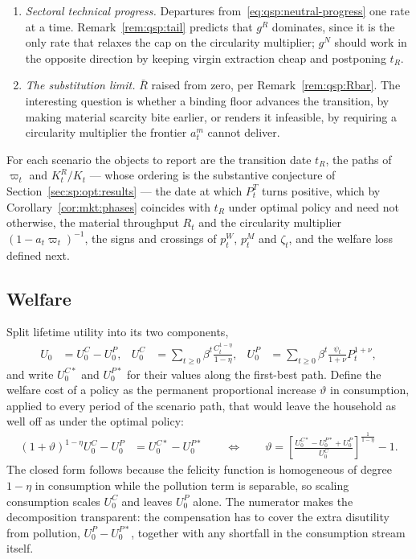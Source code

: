 \begin{enumerate}[label=\emph{(\arabic*)},leftmargin=2.4em,itemsep=0.2em]
\item \emph{Sectoral technical progress.} Departures from~\eqref{eq:qsp:neutral-progress} one rate at a
time. Remark~\ref{rem:qsp:tail} predicts that $g^R$ dominates, since it is the only rate that relaxes
the cap on the circularity multiplier; $g^N$ should work in the opposite direction by keeping virgin
extraction cheap and postponing $t_R$.

\item \emph{The substitution limit.} $\bar R$ raised from zero, per Remark~\ref{rem:qsp:Rbar}. The
interesting question is whether a binding floor advances the transition, by making material scarcity
bite earlier, or renders it infeasible, by requiring a circularity multiplier the frontier $a^m_t$
cannot deliver.
\end{enumerate}

For each scenario the objects to report are the transition date $t_R$, the paths of $\varpi_t$ and
$K^R_t/K_t$ --- whose ordering is the substantive conjecture of
Section~\ref{sec:sp:opt:results} --- the date at which $P^T_t$ turns positive, which by
Corollary~\ref{cor:mkt:phases} coincides with $t_R$ under optimal policy and need not otherwise, the
material throughput $R_t$ and the circularity multiplier $\left(1-a_t\varpi_t\right)^{-1}$, the signs
and crossings of $p^W_t$, $p^M_t$ and $\zeta_t$, and the welfare loss defined next.

\subsection{Welfare}\label{sec:qmkt:welfare}

Split lifetime utility into its two components,
\begin{align}
U_0 &= U^C_0-U^P_0,
&
U^C_0 &= \sum_{t\ge0}\beta^t\frac{C_t^{1-\eta}}{1-\eta},
&
U^P_0 &= \sum_{t\ge0}\beta^t\frac{\psi_t}{1+\nu}P_t^{1+\nu},
\label{eq:qmkt:welfare-split}
\end{align}
and write $U^{C*}_0$ and $U^{P*}_0$ for their values along the first-best path. Define the welfare cost
of a policy as the permanent proportional increase $\vartheta$ in consumption, applied to every period
of the scenario path, that would leave the household as well off as under the optimal policy:
\begin{align}
\left(1+\vartheta\right)^{1-\eta}U^C_0-U^P_0 &= U^{C*}_0-U^{P*}_0
\qquad\Longleftrightarrow\qquad
\vartheta = \left[\frac{U^{C*}_0-U^{P*}_0+U^P_0}{U^C_0}\right]^{\frac{1}{1-\eta}}-1 .
\label{eq:qmkt:cev}
\end{align}
The closed form follows because the felicity function is homogeneous of degree $1-\eta$ in consumption
while the pollution term is separable, so scaling consumption scales $U^C_0$ and leaves $U^P_0$ alone.
The numerator makes the decomposition transparent: the compensation has to cover the extra disutility
from pollution, $U^P_0-U^{P*}_0$, together with any shortfall in the consumption stream itself.

